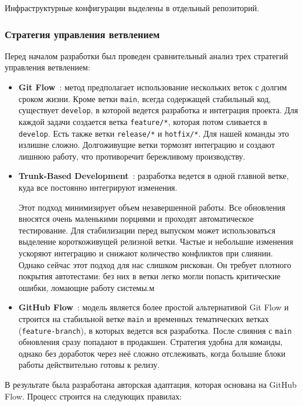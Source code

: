 Инфраструктурные конфигурации выделены в отдельный репозиторий.

\subsubsection{Стратегия управления ветвлением}
Перед началом разработки был проведен сравнительный анализ трех стратегий управления ветвлением:

\begin{itemize}
    \item \textbf{Git Flow}~\cite{driessen-gitflow}: метод предполагает использование нескольких веток с долгим сроком жизни. Кроме ветки \texttt{main}, всегда содержащей стабильный код, существует \texttt{develop}, в которой ведется разработка и интеграция проекта. Для каждой задачи создается ветка \texttt{feature/*}, которая потом сливается в \texttt{develop}. Есть также ветки \texttt{release/*} и \texttt{hotfix/*}. Для нашей команды это излишне сложно. Долгоживущие ветки тормозят интеграцию и создают лишнюю работу, что противоречит бережливому производству.
\item \textbf{Trunk-Based Development}~\cite{trunk-based-dev}: разработка ведется в одной главной ветке, куда все постоянно интегрируют изменения.

Этот подход минимизирует объем незавершенной работы. Все обновления вносятся очень маленькими порциями и проходят автоматическое тестирование. Для стабилизации перед выпуском может использоваться выделение короткоживущей релизной ветки. Частые и небольшие изменения ускоряют интеграцию и снижают количество конфликтов при слиянии. Однако сейчас этот подход для нас слишком рискован. Он требует плотного покрытия автотестами: без них в ветки легко могли попасть критические ошибки, ломающие работу системы.м
    \item \textbf{GitHub Flow}~\cite{github-flow}: модель является более простой альтернативой Git Flow и строится на стабильной ветке \texttt{main} и временных тематических ветках (\texttt{feature-branch}), в которых ведется вся разработка. После слияния с \texttt{main} обновления сразу попадают в продакшен. Стратегия удобна для команды, однако без доработок через неё сложно отслеживать, когда большие блоки работы действительно готовы к релизу.
\end{itemize}

В результате была разработана авторская адаптация, которая основана на  GitHub Flow. Процесс строится на следующих правилах:

